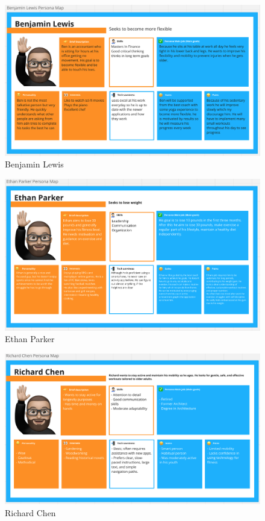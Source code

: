 \begin{figure}[H]
    \centering
    \includegraphics[width=1\textwidth]{Resources/BenjaminLewis.png}
    \caption{Benjamin Lewis}
    \label{fig:BenjaminLewis}
  \end{figure}
  \begin{figure}[H]
    \centering
    \includegraphics[width=1\textwidth]{Resources/EthanParker.png}
    \caption{Ethan Parker}
    \label{fig:EthanParker}
  \end{figure}
  \begin{figure}[H]
    \centering
    \includegraphics[width=1\textwidth]{Resources/RichardChen.png}
    \caption{Richard Chen}
    \label{fig:RichardChen}
  \end{figure}
